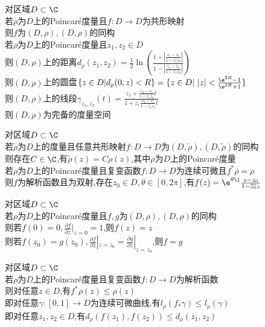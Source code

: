 \begin{dingli}
对区域$D\subset \C$\\
若$\rho$为$D$上的Poincaré度量且$f:D\to D$为共形映射\\
则$f$为$(D,\rho),(D,\rho)$的同构\\
若$\rho$为$D$上的Poincaré度量且$z_1,z_2\in D$\\
则$(D,\rho)$上的距离$d_{\rho}(z_1,z_2)=\frac{1}{2}\ln(\frac{1+|\frac{z_1-z_2}{1-\overline{z_1}z_2}|}{{1-|\frac{z_1-z_2}{1-\overline{z_1}z_2}|}})$\\
则$(D,\rho)$上的圆盘$\{z\in D|d_{\rho}(0,z)<R\}=\{z\in D|\ |z|<\frac{\e^{2R}-1}{\e^{2R}+1}\}$\\
则$(D,\rho)$上的线段$\gamma_{z_1,z_2}(t)=\frac{z_1+\frac{z_2-z_1}{1-\overline{z_1}z_2}t}{1+\overline{z_1}\frac{z_2-z_1}{1-\overline{z_1}z_2}t}$\\
则$(D,\rho)$为完备的度量空间
\end{dingli}

\begin{dingli}
对区域$D\subset \C$\\
若$\widetilde{\rho}$为$D$上的度量且任意共形映射$f:D\to D$为$(D,\widetilde{\rho}),(D,\widetilde{\rho})$的同构\\
则存在$C\in\C$,有$\widetilde{\rho}(z)=C\rho(z)$,其中$\rho$为$D$上的Poincaré度量\\
若$\rho$为$D$上的Poincaré度量且复变函数$f:D\to D$为连续可微且$f^*\rho=\rho$\\
则$f$为解析函数且为双射,存在$z_0\in D,\theta\in[0,2\pi]$,有$f(z)=\e^{\theta\i}\frac{z-z_0}{1-\overline{z_0}z}$
\end{dingli}

\begin{dingli}
对区域$D\subset \C$\\
若$\rho$为$D$上的Poincaré度量且$f,g$为$(D,\rho),(D,\rho)$的同构\\
则若$f(0)=0,\frac{\partial f}{\partial z}|_{z=0}=1$,则$f(z)=z$\\
则若$f(z_0)=g(z_0),\frac{\partial f}{\partial z}|_{z=z_0}=\frac{\partial g}{\partial z}|_{z=z_0}$,则$f=g$
\end{dingli}

\begin{dingli}
对区域$D\subset \C$\\
若$\rho$为$D$上的Poincaré度量且复变函数$f:D\to D$为解析函数\\
则对任意$z\in D$,有$f^*\rho(z)\leq\rho(z)$\\
即对任意$\gamma:[0,1]\to D$为连续可微曲线,有$l_{\rho}(f_*\gamma)\leq l_{\rho}(\gamma)$\\
即对任意$z_1,z_2\in D$,有$d_{\rho}(f(z_1),f(z_2))\leq d_{\rho}(z_1,z_2)$
\end{dingli}

